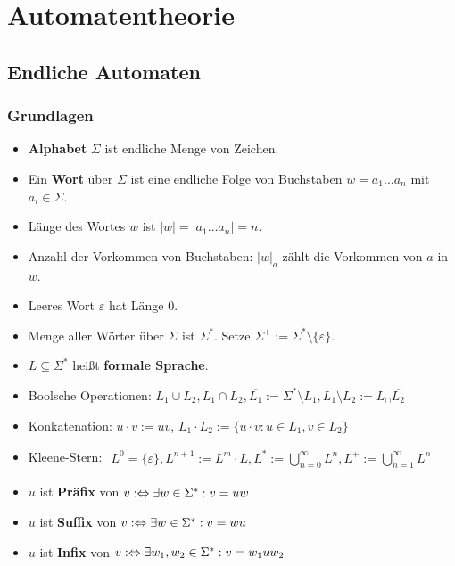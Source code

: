
\chapter{Automatentheorie}
\section{Endliche Automaten}
\subsection{Grundlagen}

\begin{itemize}
	\item \textbf{Alphabet} $\Sigma$ ist endliche Menge von Zeichen.
	\item Ein \textbf{Wort} über $\Sigma$ ist eine endliche Folge von Buchstaben $w=a_1\ldots a_n$ mit $a_i\in\Sigma$.
	\item Länge des Wortes $w$ ist $|w|=|a_1\ldots a_n|=n$.
	\item Anzahl der Vorkommen von Buchstaben: $|w|_a$ zählt die Vorkommen von $a$ in $w$.
	\item Leeres Wort $\varepsilon$ hat Länge 0.
	\item Menge aller Wörter über $\Sigma$ ist $\Sigma^\ast$. Setze $\Sigma^+:=\Sigma^\ast\setminus\lbrace\varepsilon\rbrace$.
	\item $L\subseteq\Sigma^\ast$ heißt \textbf{formale Sprache}.
	\item Boolsche Operationen: $L_1\cup L_2,L_1\cap L_2,\overline{L_1}:=\Sigma^\ast\setminus L_1,L_1\setminus L_2:=L_\cap\overline{L_2}$
	\item Konkatenation: $u\cdot v:=uv$, $L_1\cdot L_2:=\big\lbrace u\cdot v:u\in L_1,v\in L_2\big\rbrace$
	\item Kleene-Stern: $
	\begin{aligned}
		L^0=\lbrace\varepsilon\rbrace,L^{n+1}:=L^m\cdot L,L^\ast:=\bigcup\limits_{n=0}^\infty L^n, L^+:=\bigcup\limits_{n=1}^\infty L^n
	\end{aligned}$
	\item $u$ ist \textbf{Präfix} von $v:\Leftrightarrow\exists w\in\Sigma^\ast:v=uw$
	\item $u$ ist \textbf{Suffix} von $v:\Leftrightarrow\exists w\in\Sigma^\ast:v=wu$
	\item $u$ ist \textbf{Infix} von $v:\Leftrightarrow\exists w_1,w_2\in\Sigma^\ast:v=w_1 uw_2$
\end{itemize}

